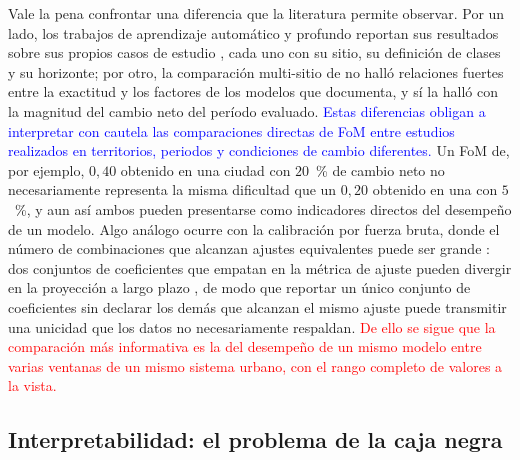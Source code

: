 Vale la pena confrontar una diferencia que la literatura permite observar. Por
un lado, los trabajos de aprendizaje automático y profundo reportan sus
resultados sobre sus propios casos de estudio
\parencite{almeida2008stochastic,Gomez2020}, cada uno con su sitio, su
definición de clases y su horizonte; por otro, la comparación multi-sitio de
\textcite{pontius2008comparing} no halló relaciones fuertes entre la exactitud
y los factores de los modelos que documenta, y sí la halló con la magnitud
del cambio neto del período evaluado. \textcolor{blue}{Estas diferencias
obligan a interpretar con cautela las comparaciones directas de FoM entre
estudios realizados en territorios, periodos y condiciones de cambio
diferentes.} Un FoM de, por ejemplo, $0{,}40$ obtenido en una ciudad con
$20$~\% de cambio neto no necesariamente representa la misma dificultad que un
$0{,}20$ obtenido en una con $5$~\%, y aun así ambos pueden presentarse como
indicadores directos del desempeño de un modelo. Algo análogo ocurre con la
calibración por fuerza bruta, donde el número de combinaciones que alcanzan
ajustes equivalentes puede ser grande \parencite{Dietzel2007}: dos conjuntos
de coeficientes que empatan en la métrica de ajuste pueden divergir en la
proyección a largo plazo \parencite{Beven2006}, de modo que reportar un único
conjunto de coeficientes sin declarar los demás que alcanzan el mismo ajuste
puede transmitir una unicidad que los datos no necesariamente respaldan.
\textcolor{red}{De ello se sigue que la comparación más informativa es la del
desempeño de un mismo modelo entre varias ventanas de un mismo sistema urbano,
con el rango completo de valores a la vista.}


%


\subsection{Interpretabilidad: el problema de la caja negra}

